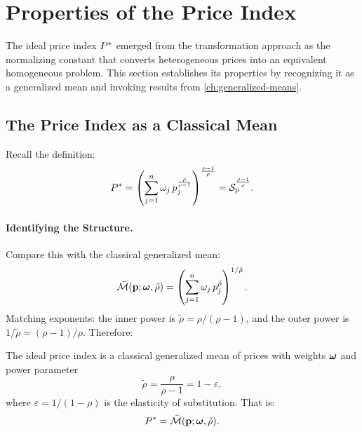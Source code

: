 \section{Properties of the Price Index}
\label{sec:price-index-properties}

The ideal price index $P^{*}$ emerged from the transformation approach as the normalizing constant that converts heterogeneous prices into an equivalent homogeneous problem. This section establishes its properties by recognizing it as a generalized mean and invoking results from \cref{ch:generalized-means}.

\subsection{The Price Index as a Classical Mean}
\label{subsec:price-index-mean}

Recall the definition:
\begin{equation}
\label{eq:price-index-recall}
P^{*} = \left( \sum_{j=1}^{n} \omega_j \, p_j^{\frac{\rho}{\rho-1}} \right)^{\frac{\rho-1}{\rho}} = \mathcal{S}_p^{\frac{\rho-1}{\rho}}.
\end{equation}

\paragraph{Identifying the Structure.}
Compare this with the classical generalized mean:
\begin{equation}
\bar{\mathcal{M}}(\mathbf{p}; \boldsymbol{\omega}, \tilde{\rho}) = \left( \sum_{j=1}^{n} \omega_j \, p_j^{\tilde{\rho}} \right)^{1/\tilde{\rho}}.
\end{equation}
Matching exponents: the inner power is $\tilde{\rho} = \rho/(\rho-1)$, and the outer power is $1/\tilde{\rho} = (\rho-1)/\rho$. Therefore:

\begin{proposition}
\label{prop:price-index-mean}
The ideal price index is a classical generalized mean of prices with weights $\boldsymbol{\omega}$ and power parameter
\begin{equation}
\label{eq:tilde-rho}
\boxed{\tilde{\rho} = \frac{\rho}{\rho-1} = 1 - \varepsilon,}
\end{equation}
where $\varepsilon = 1/(1-\rho)$ is the elasticity of substitution. That is:
\begin{equation}
P^{*} = \bar{\mathcal{M}}(\mathbf{p}; \boldsymbol{\omega}, \tilde{\rho}).
\end{equation}
\end{proposition}


